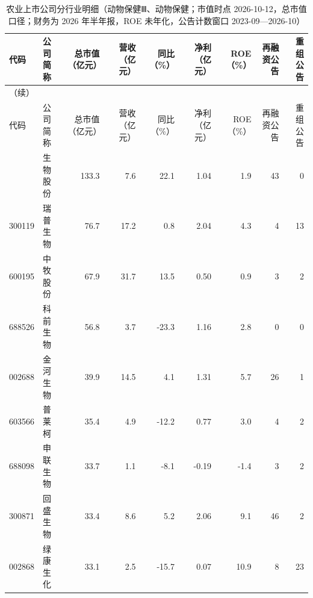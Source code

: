 \begingroup\scriptsize\setlength{\tabcolsep}{2pt}
\begin{longtable}{@{}llrrrrrrr@{}}
\caption{农业上市公司分行业明细（动物保健Ⅲ、动物保健；市值时点 2026-10-12，总市值口径；财务为 2026 年半年报，ROE 未年化，公告计数窗口 2023-09---2026-10）}\label{tab:comp-vet}\\
\toprule
代码 & 公司简称 & 总市值（亿元） & 营收（亿元） & 同比（\%） & 净利（亿元） & ROE（\%） & 再融资公告 & 重组公告 \\
\midrule
\endfirsthead
\multicolumn{9}{l}{\small（续）}\\
\toprule
代码 & 公司简称 & 总市值（亿元） & 营收（亿元） & 同比（\%） & 净利（亿元） & ROE（\%） & 再融资公告 & 重组公告 \\
\midrule
\endhead
\bottomrule
\endlastfoot
600201 & 生物股份 & 133.3 & 7.6 & 22.1 & 1.04 & 1.9 & 43 & 0 \\
300119 & 瑞普生物 & 76.7 & 17.2 & 0.8 & 2.04 & 4.3 & 4 & 13 \\
600195 & 中牧股份 & 67.9 & 31.7 & 13.5 & 0.50 & 0.9 & 3 & 2 \\
688526 & 科前生物 & 56.8 & 3.7 & -23.3 & 1.16 & 2.8 & 0 & 0 \\
002688 & 金河生物 & 39.9 & 14.5 & 4.1 & 1.31 & 5.7 & 26 & 1 \\
603566 & 普莱柯 & 35.4 & 4.9 & -12.2 & 0.77 & 3.0 & 4 & 2 \\
688098 & 申联生物 & 33.7 & 1.1 & -8.1 & -0.19 & -1.4 & 3 & 2 \\
300871 & 回盛生物 & 33.4 & 8.6 & 5.2 & 2.06 & 9.1 & 46 & 2 \\
002868 & 绿康生化 & 33.1 & 2.5 & -15.7 & 0.07 & 10.9 & 8 & 23 \\
\end{longtable}
\endgroup
